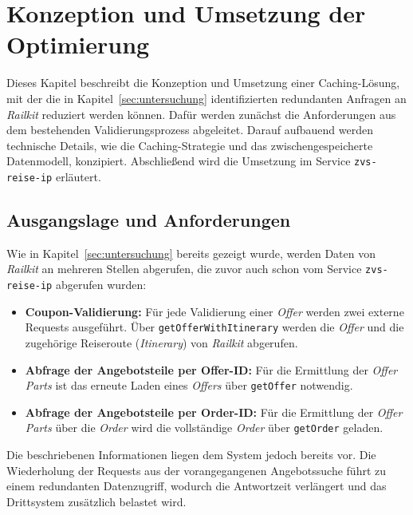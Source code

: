 \section{Konzeption und Umsetzung der Optimierung}
\label{sec:konzeption}

Dieses Kapitel beschreibt die Konzeption und Umsetzung einer Caching-Lösung, mit der die in Kapitel~\ref{sec:untersuchung} identifizierten redundanten Anfragen an \textit{Railkit} reduziert werden können. Dafür werden zunächst die Anforderungen aus dem bestehenden Validierungsprozess abgeleitet. Darauf aufbauend werden technische Details, wie die Caching-Strategie und das zwischengespeicherte Datenmodell, konzipiert. Abschließend wird die Umsetzung im Service \texttt{zvs-reise-ip} erläutert.


\subsection{Ausgangslage und Anforderungen}
\label{subsec:anforderungen}

Wie in Kapitel~\ref{sec:untersuchung} bereits gezeigt wurde, werden Daten von \textit{Railkit} an mehreren Stellen abgerufen, die zuvor auch schon vom Service \texttt{zvs-reise-ip} abgerufen wurden:

\begin{itemize}
    \item \textbf{Coupon-Validierung:} Für jede Validierung einer \textit{Offer} werden zwei externe Requests ausgeführt. Über \texttt{getOfferWithItinerary} werden die \textit{Offer} und die zugehörige Reiseroute (\textit{Itinerary}) von \textit{Railkit} abgerufen.
    \item \textbf{Abfrage der Angebotsteile per Offer-ID:} Für die Ermittlung der \textit{Offer Parts} ist das erneute Laden eines \textit{Offers} über \texttt{getOffer} notwendig.
    \item \textbf{Abfrage der Angebotsteile per Order-ID:} Für die Ermittlung der \textit{Offer Parts} über die \textit{Order} wird die vollständige \textit{Order} über \texttt{getOrder} geladen.
    
\end{itemize}

Die beschriebenen Informationen liegen dem System jedoch bereits vor. Die Wiederholung der Requests aus der vorangegangenen Angebotssuche führt zu einem redundanten Datenzugriff, wodurch die Antwortzeit verlängert und das Drittsystem zusätzlich belastet wird.

